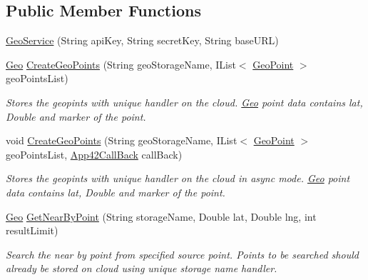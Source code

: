 \subsection*{Public Member Functions}
\begin{DoxyCompactItemize}
\item 
\hyperlink{classcom_1_1shephertz_1_1app42_1_1paas_1_1sdk_1_1csharp_1_1geo_1_1_geo_service_a4196eb7baac5795ca9891b176c176e1b}{Geo\+Service} (String api\+Key, String secret\+Key, String base\+U\+R\+L)
\item 
\hyperlink{classcom_1_1shephertz_1_1app42_1_1paas_1_1sdk_1_1csharp_1_1geo_1_1_geo}{Geo} \hyperlink{classcom_1_1shephertz_1_1app42_1_1paas_1_1sdk_1_1csharp_1_1geo_1_1_geo_service_a784d23fd7625983661edfc33746da8fe}{Create\+Geo\+Points} (String geo\+Storage\+Name, I\+List$<$ \hyperlink{classcom_1_1shephertz_1_1app42_1_1paas_1_1sdk_1_1csharp_1_1geo_1_1_geo_point}{Geo\+Point} $>$ geo\+Points\+List)
\begin{DoxyCompactList}\small\item\em Stores the geopints with unique handler on the cloud. \hyperlink{classcom_1_1shephertz_1_1app42_1_1paas_1_1sdk_1_1csharp_1_1geo_1_1_geo}{Geo} point data contains lat, Double and marker of the point. \end{DoxyCompactList}\item 
void \hyperlink{classcom_1_1shephertz_1_1app42_1_1paas_1_1sdk_1_1csharp_1_1geo_1_1_geo_service_a7a77a5fe51599784dc51ad40c7f0075c}{Create\+Geo\+Points} (String geo\+Storage\+Name, I\+List$<$ \hyperlink{classcom_1_1shephertz_1_1app42_1_1paas_1_1sdk_1_1csharp_1_1geo_1_1_geo_point}{Geo\+Point} $>$ geo\+Points\+List, \hyperlink{interfacecom_1_1shephertz_1_1app42_1_1paas_1_1sdk_1_1csharp_1_1_app42_call_back}{App42\+Call\+Back} call\+Back)
\begin{DoxyCompactList}\small\item\em Stores the geopints with unique handler on the cloud in async mode. \hyperlink{classcom_1_1shephertz_1_1app42_1_1paas_1_1sdk_1_1csharp_1_1geo_1_1_geo}{Geo} point data contains lat, Double and marker of the point. \end{DoxyCompactList}\item 
\hyperlink{classcom_1_1shephertz_1_1app42_1_1paas_1_1sdk_1_1csharp_1_1geo_1_1_geo}{Geo} \hyperlink{classcom_1_1shephertz_1_1app42_1_1paas_1_1sdk_1_1csharp_1_1geo_1_1_geo_service_aa954313e4c8b15822da9566fdfeab681}{Get\+Near\+By\+Point} (String storage\+Name, Double lat, Double lng, int result\+Limit)
\begin{DoxyCompactList}\small\item\em Search the near by point from specified source point. Points to be searched should already be stored on cloud using unique storage name handler. \end{DoxyCompactList}\item 

\end{DoxyCompactItemize}
